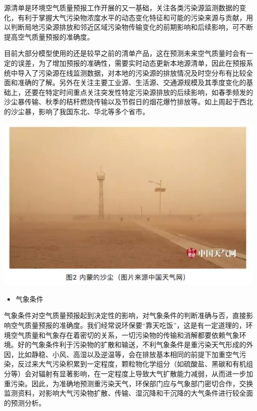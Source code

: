 \documentclass[
]{book}
\providecommand{\tightlist}{%
  \setlength{\itemsep}{0pt}\setlength{\parskip}{0pt}}
\begin{document}
源清单是环境空气质量预报工作开展的又一基础，关注各类污染源监测数据的变化，有利于掌握大气污染物浓度水平的动态变化特征和可能的污染来源与贡献，用以判断局地污染源排放和邻近区域污染物传输变化的前期影响和后续影响，可不断提高空气质量预报的准确度。

目前大部分模型使用的还是较早之前的清单产品，这在预测未来空气质量时会有一定的误差，为了增加预报的准确性，需要实时动态更新本地源清单，因此在预报系统中导入了污染源在线监测数据，对本地的污染源的排放情况及时空分布有比较全面和准确的了解。另外在关注主要工业源、生活源、交通源规模及其季度变化的基础上，还要在特定时间重点关注突发性特定污染源排放的后续影响，如春季频发的沙尘暴传输、秋季的秸秆燃烧传输以及节假日的烟花爆竹排放等。如上周起于西北的沙尘暴，影响了我国东北、华北等多个省市。

\includegraphics[width=8.33in]{images/kqyb2}

\begin{itemize}
\tightlist
\item
  气象条件
\end{itemize}

气象条件对空气质量预报起到决定性的影响，对气象条件的判断准确与否，直接影响空气质量预报的准确度。我们经常说环保要``靠天吃饭''，这是有一定道理的，环境空气质量和气象存在着密切的关系，一切污染物的传输和消解都要依赖气象环境。好的气象条件利于污染物的扩散和输送，不利气象条件是重污染天气形成的外因，比如静稳、小风、高湿以及逆温等，会在排放基本相同的前提下加重空气污染，反过来大气污染积累到一定程度，颗粒物化学组分（如硫酸盐、黑碳和有机组分等）会对辐射有显著影响，在一定程度上导致大气扩散能力减弱，从而进一步加重污染。因此，为准确地预测重污染天气，环保部门应与气象部门密切合作，交换监测资料，对影响大气污染物扩散、传输、湿沉降和干沉降的大气条件进行较全面的预测分析。
\end{document}
